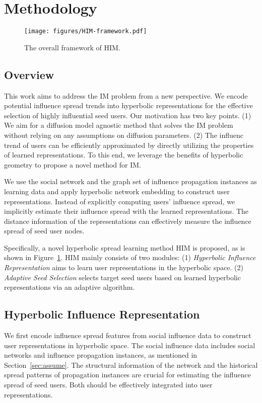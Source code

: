 \section{Methodology}
\label{sec:method}
\begin{figure}[!ht]
\centering
    \texttt{[image: figures/HIM-framework.pdf]}
    \caption{The overall framework of HIM.}
    \label{fig:HIM}
\end{figure}
\subsection{Overview}
This work aims to address the IM problem from a new perspective.
We encode potential influence spread trends into hyperbolic representations for the effective selection of highly influential seed users.
Our motivation has two key points.
(1) We aim for a diffusion model agnostic method that solves the IM problem without relying on any assumptions on diffusion parameters.
(2) The influenc trend of users can be efficiently approximated by directly utilizing the properties of learned representations.
To this end, we leverage the benefits of hyperbolic geometry to propose a novel method for IM.

We use the social network and the graph set of influence propagation instances as learning data and apply hyperbolic network embedding to construct user representations.
Instead of explicitly computing users' influence spread, we implicitly estimate their influence spread with the learned representations.
The distance information of the representations can effectively measure the influence spread of seed user nodes.

Specifically, a novel hyperbolic spread learning method HIM is proposed, as is shown in Figure~\ref{fig:HIM}. HIM mainly consists of two modules: (1) \textit{Hyperbolic Influence Representation} aims to learn user representations in the hyperbolic space. (2) \textit{Adaptive Seed Selection} selects target seed users based on learned hyperbolic representations via an adaptive algorithm. 

\subsection{Hyperbolic Influence Representation}
We first encode influence spread features from social influence data to construct user representations in hyperbolic space. The social influence data includes social networks and influence propagation instances, as mentioned in Section~\ref{sec:assume}.
The structural information of the network and the historical spread patterns of propagation instances are crucial for estimating the influence spread of seed users. Both should be effectively integrated into user representations.

